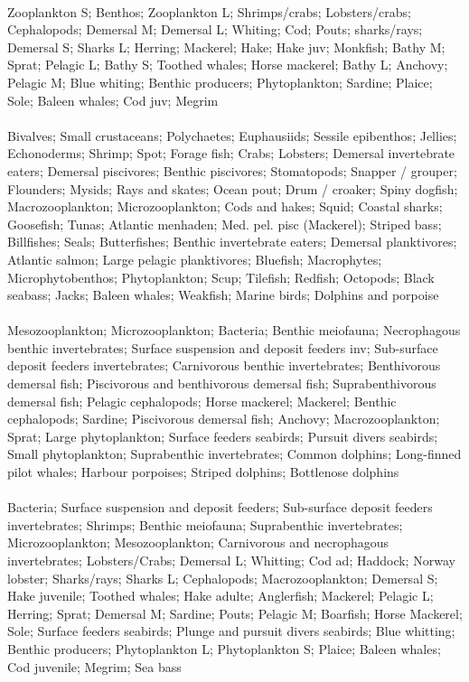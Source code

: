 \fullhline
\hline
{} \\
\hline
Zooplankton S; Benthos; Zooplankton L; Shrimps/crabs; Lobsters/crabs; Cephalopods; Demersal M; Demersal L; Whiting; Cod; Pouts; sharks/rays; Demersal S; Sharks L; Herring; Mackerel; Hake; Hake juv; Monkfish; Bathy M; Sprat; Pelagic L; Bathy S; Toothed whales; Horse mackerel; Bathy L; Anchovy; Pelagic M; Blue whiting; Benthic producers; Phytoplankton; Sardine; Plaice; Sole; Baleen whales; Cod juv; Megrim\\
\fullhline
\hline
{} \\
\hline
Bivalves; Small crustaceans; Polychaetes; Euphausiids; Sessile epibenthos; Jellies; Echonoderms; Shrimp; Spot; Forage fish; Crabs; Lobsters; Demersal invertebrate eaters; Demersal piscivores; Benthic piscivores; Stomatopods; Snapper / grouper; Flounders; Mysids; Rays and skates; Ocean pout; Drum / croaker; Spiny dogfish; Macrozooplankton; Microzooplankton; Cods and hakes; Squid; Coastal sharks; Goosefish; Tunas; Atlantic menhaden; Med. pel. pisc (Mackerel); Striped bass; Billfishes; Seals; Butterfishes; Benthic invertebrate eaters; Demersal planktivores; Atlantic salmon; Large pelagic planktivores; Bluefish; Macrophytes; Microphytobenthos; Phytoplankton; Scup; Tilefish; Redfish; Octopods; Black seabass; Jacks; Baleen whales; Weakfish; Marine birds; Dolphins and porpoise\\
\fullhline
\hline
{} \\
\hline
Mesozooplankton; Microzooplankton; Bacteria; Benthic meiofauna; Necrophagous benthic invertebrates; Surface suspension and deposit feeders inv; Sub-surface deposit feeders invertebrates; Carnivorous benthic invertebrates; Benthivorous demersal fish; Piscivorous and benthivorous demersal fish; Suprabenthivorous demersal fish; Pelagic cephalopods; Horse mackerel; Mackerel; Benthic cephalopods; Sardine; Piscivorous demersal fish; Anchovy; Macrozooplankton; Sprat; Large phytoplankton; Surface feeders seabirds; Pursuit divers seabirds; Small phytoplankton; Suprabenthic invertebrates; Common dolphins; Long-finned pilot whales; Harbour porpoises; Striped dolphins; Bottlenose dolphins\\
\fullhline
\hline
{} \\
\hline
Bacteria; Surface suspension and deposit feeders; Sub-surface deposit feeders invertebrates; Shrimps; Benthic meiofauna; Suprabenthic invertebrates; Microzooplankton; Mesozooplankton; Carnivorous and necrophagous invertebrates; Lobsters/Crabs; Demersal L; Whitting; Cod ad; Haddock; Norway lobster; Sharks/rays; Sharks L; Cephalopods; Macrozooplankton; Demersal S; Hake juvenile; Toothed whales; Hake adulte; Anglerfish; Mackerel; Pelagic L; Herring; Sprat; Demersal M; Sardine; Pouts; Pelagic M; Boarfish; Horse Mackerel; Sole; Surface feeders seabirds; Plunge and pursuit divers seabirds; Blue whitting; Benthic producers; Phytoplankton L; Phytoplankton S; Plaice; Baleen whales; Cod juvenile; Megrim; Sea bass\\
